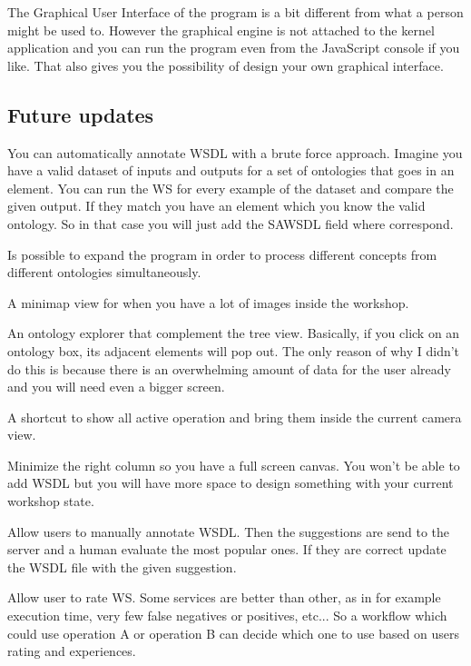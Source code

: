 \documentclass[a4paper,10pt]{article}
\begin{document}
  The Graphical User Interface of the program is a bit different from what a person might be used to. However the graphical engine is not attached to the kernel application and you can run the program even from the JavaScript console if you like. That also gives you the possibility of design your own graphical interface.

  \subsection{Future updates}

  You can automatically annotate WSDL with a brute force approach. Imagine you have a valid dataset of inputs and outputs for a set of ontologies that goes in an element. You can run the WS for every example of the dataset and compare the given output. If they match you have an element which you know the valid ontology. So in that case you will just add the SAWSDL field where correspond.\vspace{3 mm}

  Is possible to expand the program in order to process different concepts from different ontologies simultaneously.\vspace{3 mm}

  A minimap view for when you have a lot of images inside the workshop.\vspace{3 mm}

  An ontology explorer that complement the tree view. Basically, if you click on an ontology box, its adjacent elements will pop out. The only reason of why I didn't do this is because there is an overwhelming amount of data for the user already and you will need even a bigger screen.\vspace{3 mm}

  A shortcut to show all active operation and bring them inside the current camera view.\vspace{3 mm}

  Minimize the right column so you have a full screen canvas. You won't be able to add WSDL but you will have more space to design something with your current workshop state.\vspace{3 mm}

  Allow users to manually annotate WSDL. Then the suggestions are send to the server and a human evaluate the most popular ones. If they are correct update the WSDL file with the given suggestion.\vspace{3 mm}

  Allow user to rate WS. Some services are better than other, as in for example execution time, very few false negatives or positives, etc... So a workflow which could use operation A or operation B can decide which one to use based on users rating and experiences.\vspace{3 mm}
\end{document}
